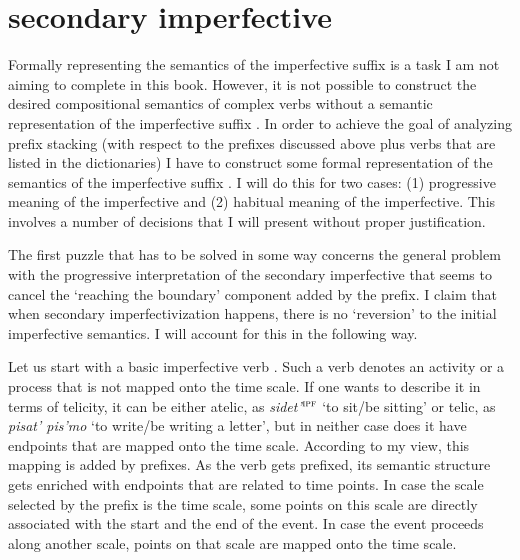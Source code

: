 \section{secondary imperfective }\label{section:imperfective}
Formally representing the semantics of the imperfective suffix   is a task I am not aiming to complete in this book. However, it is not possible to construct the desired compositional semantics of complex verbs  without a semantic representation of the imperfective suffix  . In order to achieve the goal of analyzing prefix stacking  (with respect to the prefixes discussed above plus verbs that are listed in the dictionaries) I have to construct some formal representation of the semantics of the imperfective suffix  . I will do this for two cases: (1) progressive meaning of the imperfective and (2) habitual meaning of the imperfective. This involves a number of decisions that I will present without proper justification.

The first puzzle that has to be solved in some way concerns the general problem with the progressive interpretation  of the secondary imperfective  that seems to cancel the `reaching the boundary' component added by the prefix. I claim that when secondary imperfectivization  happens, there is no `reversion' to the initial imperfective semantics. I will account for this in the following way. 

Let us start with a basic imperfective verb . Such a verb denotes an activity or a process that is not mapped onto the time scale. If one wants to describe it in terms of telicity, it can be either atelic, as \textit{sidet'}$^{\textsc{ipf}}$ `to sit/be sitting' or telic, as \textit{pisat' pis'mo} `to write/be writing a letter', but in neither case does it have endpoints that are mapped onto the time scale. According to my view, this mapping is added by prefixes. As the verb gets prefixed, its semantic structure gets enriched with endpoints that are related to time points. In case the scale selected by the prefix is the time scale, some points on this scale are directly associated with the start and the end of the event. In case the event proceeds along another scale, points on that scale are mapped onto the time scale. 


